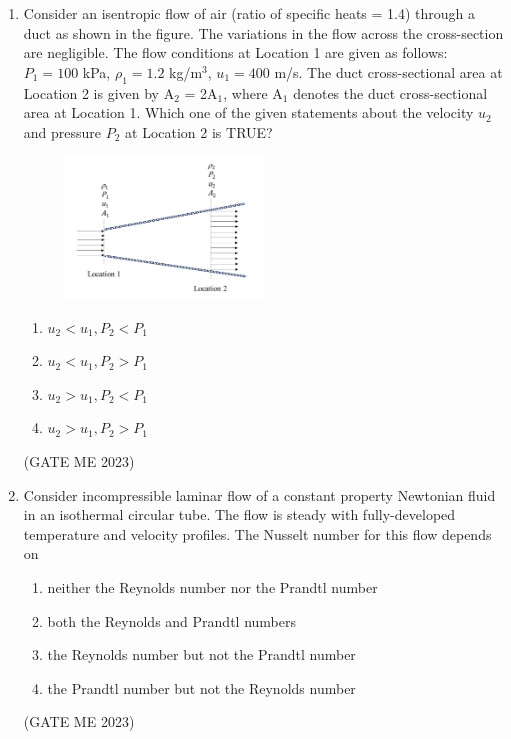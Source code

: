 \documentclass[journal]{IEEEtran}
\begin{document}
\begin{enumerate}
\item Consider an isentropic flow of air (ratio of specific heats = 1.4) through a duct as shown in the figure. The variations in the flow across the cross-section are negligible. The flow conditions at Location 1 are given as follows: $ P_1 = 100 $ kPa, $ \rho_1 = 1.2 $ kg/m$^3$, $ u_1 = 400 $ m/s. The duct cross-sectional area at Location 2 is given by A$_2$ = 2A$_1$, where A$_1$ denotes the duct cross-sectional area at Location 1. Which one of the given statements about the velocity $ u_2 $ and pressure $ P_2 $ at Location 2 is TRUE?
\begin{figure}[H]
\centering
\includegraphics[width=0.5\textwidth]{Fig 14.png}
\caption{}
\label{fig:question20}
\end{figure}

\begin{enumerate}
    \item $ u_2 < u_1 , P_2 < P_1 $
    \item $ u_2 < u_1 , P_2 > P_1 $
    \item $ u_2 > u_1 , P_2 < P_1 $
    \item $ u_2 > u_1 , P_2 > P_1 $
\end{enumerate}
\hfill (GATE ME 2023)

\item Consider incompressible laminar flow of a constant property Newtonian fluid in an isothermal circular tube. The flow is steady with fully-developed temperature and velocity profiles. The Nusselt number for this flow depends on

\begin{enumerate}
    \item neither the Reynolds number nor the Prandtl number
    \item both the Reynolds and Prandtl numbers
    \item the Reynolds number but not the Prandtl number
    \item the Prandtl number but not the Reynolds number
\end{enumerate}
\hfill (GATE ME 2023)


\end{enumerate}
\end{document}
